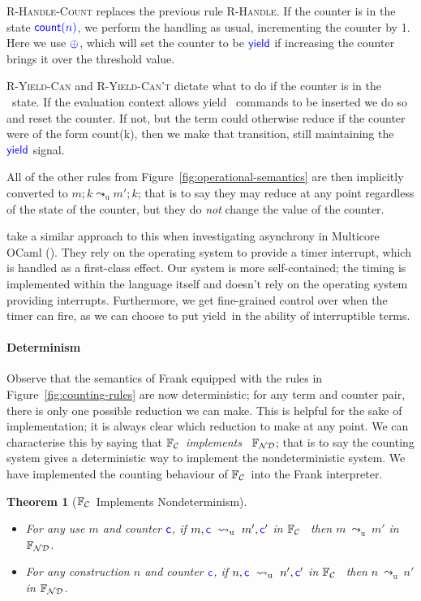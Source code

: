 \documentclass[msc,deptreport,cs]{infthesis} %
\newtheorem{theorem}{Theorem}
\newcommand\nondetfrank{$\mathbb{F}_{\cal{ND}}$}
\newcommand\countingfrank{$\mathbb{F}_{\cal{C}}$}
\newcommand{\counter}{{\color{blue} \textsf{c}}}
\newcommand{\justc}[1]{{\color{blue} \textsf{count}({#1})}}
\newcommand{\yieldc}{{\color{blue}{\textsf{yield}}}}
\newcommand{\plusc}{{\color{blue} \oplus}}
\newcommand\yield{\textsf{yield}\xspace}
\newcommand{\redtou}{\leadsto_{\mathrm{u}}}
\begin{document}
\textsc{R-Handle-Count} replaces the previous rule \textsc{R-Handle}. If the
counter is in the state $\justc{n}$, we perform the handling as usual,
incrementing the counter by 1. Here we use $\plusc$, which will set the counter
to be $\yieldc$ if increasing the counter brings it over the threshold value.

\textsc{R-Yield-Can} and \textsc{R-Yield-Can't} dictate what to do if the
counter is in the \yieldc~state. If the evaluation context allows \yield~
commands to be inserted we do so and reset the counter. If not, but the term
could otherwise reduce if the counter were of the form \justc{k}, then we make
that transition, still maintaining the $\yieldc$ signal.

All of the other rules from Figure~\ref{fig:operational-semantics} are then
implicitly converted to $m; k \redtou m'; k$; that is to say they may reduce at
any point regardless of the state of the counter, but they do \emph{not} change
the value of the counter.

\citeauthor{dolan2017concurrent} take a similar approach to this when
investigating asynchrony in Multicore OCaml (\cite{dolan2017concurrent}). They
rely on the operating system to provide a timer interrupt, which is handled as a
first-class effect. Our system is more self-contained; the timing is implemented
within the language itself and doesn't rely on the operating system providing
interrupts. Furthermore, we get fine-grained control over when the timer can
fire, as we can choose to put \yield~in the ability of interruptible
terms.

\paragraph*{Determinism}
Observe that the semantics of Frank equipped with the rules in
Figure~\ref{fig:counting-rules} are now deterministic; for any term and counter
pair, there is only one possible reduction we can make. This is helpful for the
sake of implementation; it is always clear which reduction to make at any
point. We can characterise this by saying that \countingfrank~\emph{implements}~
\nondetfrank; that is to say the counting system gives a deterministic way to
implement the nondeterministic system. We have implemented the counting
behaviour of \countingfrank~into the Frank interpreter.

\begin{theorem}[\countingfrank~Implements Nondeterminism]~
\begin{itemize}
\item For any use $m$ and counter $\counter$, if $m, \counter~\redtou~
  m',\counter'$ in \countingfrank~ then $m~\redtou~m'$ in \nondetfrank.
\item For any construction $n$ and counter $\counter$, if $n, \counter~\redtou~
  n',\counter'$ in \countingfrank~ then $n~\redtou~n'$ in \nondetfrank.
\end{itemize}
\end{theorem}
\end{document}
